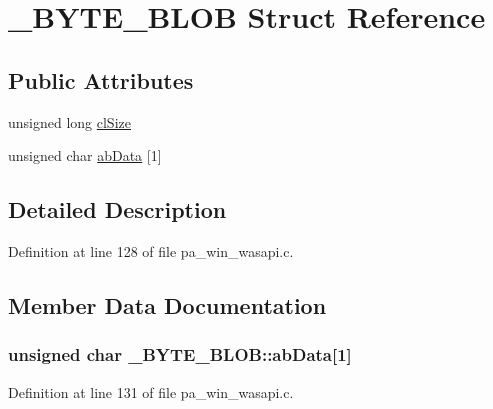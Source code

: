 \hypertarget{struct___b_y_t_e___b_l_o_b}{}\section{\+\_\+\+B\+Y\+T\+E\+\_\+\+B\+L\+OB Struct Reference}
\label{struct___b_y_t_e___b_l_o_b}
\subsection*{Public Attributes}
\begin{DoxyCompactItemize}
\item 
unsigned long \hyperlink{struct___b_y_t_e___b_l_o_b_a13be4b59f9b0a4142143e52fede86481}{cl\+Size}
\item 
unsigned char \hyperlink{struct___b_y_t_e___b_l_o_b_aee73207e09675f03e1f7985251dcc50b}{ab\+Data} \mbox{[}1\mbox{]}
\end{DoxyCompactItemize}


\subsection{Detailed Description}


Definition at line 128 of file pa\+\_\+win\+\_\+wasapi.\+c.



\subsection{Member Data Documentation}
\subsubsection[{\texorpdfstring{ab\+Data}{abData}}]{\setlength{\rightskip}{0pt plus 5cm}unsigned char \+\_\+\+B\+Y\+T\+E\+\_\+\+B\+L\+O\+B\+::ab\+Data\mbox{[}1\mbox{]}}\hypertarget{struct___b_y_t_e___b_l_o_b_aee73207e09675f03e1f7985251dcc50b}{}\label{struct___b_y_t_e___b_l_o_b_aee73207e09675f03e1f7985251dcc50b}


Definition at line 131 of file pa\+\_\+win\+\_\+wasapi.\+c.

